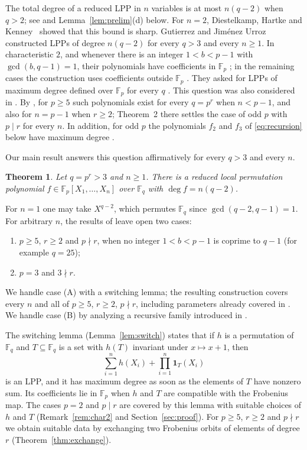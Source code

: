 \documentclass[11pt]{amsart}
\newtheorem{theorem}{Theorem}[section]
\theoremstyle{definition}
\theoremstyle{remark}
\newcommand{\F}{\mathbb{F}}
\newcommand{\one}{\mathbf{1}}
\begin{document}
The total degree of a reduced LPP in $n$ variables is at most $n(q-2)$ when $q>2$; see \cite[Proposition~1]{GU23} and Lemma~\ref{lem:prelim}(d) below. For $n=2$, Diestelkamp, Hartke and Kenney~\cite{DHK} showed that this bound is sharp. Gutierrez and Jim\'enez Urroz~\cite{GU25a} constructed LPPs of degree $n(q-2)$ for every $q>3$ and every $n\ge1$. In characteristic $2$, and whenever there is an integer $1<b<p-1$ with $\gcd(b,q-1)=1$, their polynomials have coefficients in $\F_p$ \cite[Theorems~4 and~5]{GU25a}; in the remaining cases the construction uses coefficients outside $\F_p$ \cite[Theorem~6]{GU25a}. They asked for LPPs of maximum degree defined over $\F_p$ for every $q$ \cite[Section~6]{GU25a}. This question was also considered in \cite{GU25b}. By \cite[Theorem~1]{GU25b}, for $p\ge5$ such polynomials exist for every $q=p^r$ when $n<p-1$, and also for $n=p-1$ when $r\ge2$; Theorem~2 there settles the case of odd $p$ with $p\mid r$ for every $n$. In addition, for odd $p$ the polynomials $f_2$ and $f_3$ of \eqref{eq:recursion} below have maximum degree \cite[Theorems~7 and~8]{GU25a}.

Our main result answers this question affirmatively for every $q>3$ and every $n$.

\begin{theorem}\label{thm:main}
Let $q=p^r>3$ and $n\ge1$. There is a reduced local permutation polynomial $f\in\F_p[X_1,\dots,X_n]$ over $\F_q$ with $\deg f=n(q-2)$.
\end{theorem}

For $n=1$ one may take $X^{q-2}$, which permutes $\F_q$ since $\gcd(q-2,q-1)=1$. For arbitrary $n$, the results of \cite{GU25a,GU25b} leave open two cases:
\begin{enumerate}
\item[(A)] $p\ge5$, $r\ge2$ and $p\nmid r$, when no integer $1<b<p-1$ is coprime to $q-1$ (for example $q=25$);
\item[(B)] $p=3$ and $3\nmid r$.
\end{enumerate}
We handle case (A) with a switching lemma; the resulting construction covers every $n$ and all of $p\ge5$, $r\ge2$, $p\nmid r$, including parameters already covered in \cite{GU25a,GU25b}. We handle case (B) by analyzing a recursive family introduced in \cite{GU25a}.

The switching lemma (Lemma~\ref{lem:switch}) states that if $h$ is a permutation of $\F_q$ and $T\subseteq\F_q$ is a set with $h(T)$ invariant under $x\mapsto x+1$, then
\[
\sum_{i=1}^n h(X_i)+\prod_{i=1}^n \one_T(X_i)
\]
is an LPP, and it has maximum degree as soon as the elements of $T$ have nonzero sum. Its coefficients lie in $\F_p$ when $h$ and $T$ are compatible with the Frobenius map. The cases $p=2$ and $p\mid r$ are covered by this lemma with suitable choices of $h$ and $T$ (Remark~\ref{rem:char2} and Section~\ref{sec:proof}). For $p\ge5$, $r\ge2$ and $p\nmid r$ we obtain suitable data by exchanging two Frobenius orbits of elements of degree $r$ (Theorem~\ref{thm:exchange}).
\end{document}
